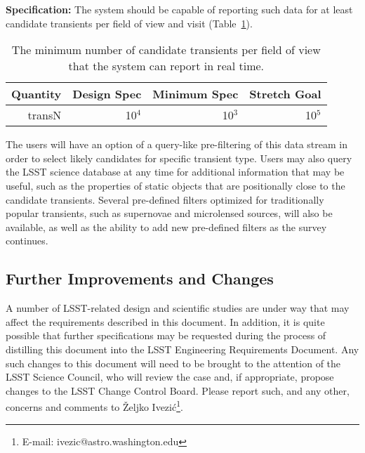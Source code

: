 {\bf Specification:} The system should be capable of reporting such data for
at least    candidate transients per
field of view and visit (Table~\ref{transN}).
\begin{table}[h]
\begin{tabular}{|r|r|r|r|}
\hline
     Quantity         &   Design Spec & Minimum Spec  & Stretch Goal   \\
\hline
    transN              &       10$^4$    &      10$^3$      &       10$^5$     \\
\hline
\end{tabular}
\caption{The minimum number of candidate transients per field
of view that the system can report in real time.}
\label{transN}
\end{table}

The users
will have an option of a query-like pre-filtering of this data stream
in order to select likely candidates for specific transient type. Users
may also query the LSST science database at any time for additional
information that may be useful, such as the properties of static objects
that are positionally close to the candidate transients.
Several pre-defined filters optimized for traditionally popular transients,
such as supernovae and microlensed sources, will also be available,
as well as the ability to add new pre-defined filters as the survey
continues.


\subsection{Further Improvements and Changes}

A number of LSST-related design and scientific studies are under way that
may affect the requirements described in this document. In addition, it is
quite possible that further specifications may be requested during the
process of distilling this document into the LSST Engineering Requirements
Document. Any such changes to this document will need to be brought to the
attention of the LSST Science Council, who will review the case and, if
appropriate, propose changes to the LSST Change Control Board. Please report
such, and any other, concerns and comments to \v{Z}eljko
Ivezi\'{c}\footnote{E-mail: ivezic@astro.washington.edu}.

